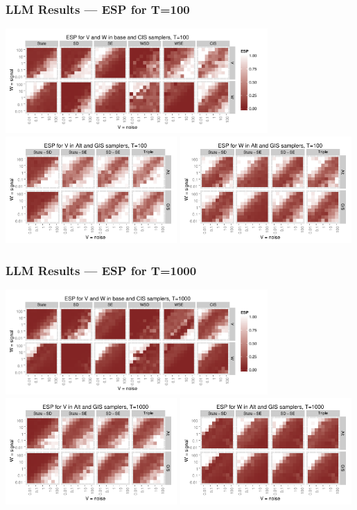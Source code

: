 \documentclass[xcolor=dvipsnames]{beamer}
\begin{document}
\begin{frame}
\frametitle{LLM Results --- ESP for T=100}
\centering
\includegraphics[width=0.75\textwidth]{basecisESplot100}\\
\includegraphics[width=0.49\textwidth]{altintESplotV100}
\includegraphics[width=0.49\textwidth]{altintESplotW100}
\end{frame}

\begin{frame}
\frametitle{LLM Results --- ESP for T=1000}
\centering
\includegraphics[width=0.75\textwidth]{basecisESplot1000}\\
\includegraphics[width=0.49\textwidth]{altintESplotV1000}
\includegraphics[width=0.49\textwidth]{altintESplotW1000}
\end{frame}
\end{document}
